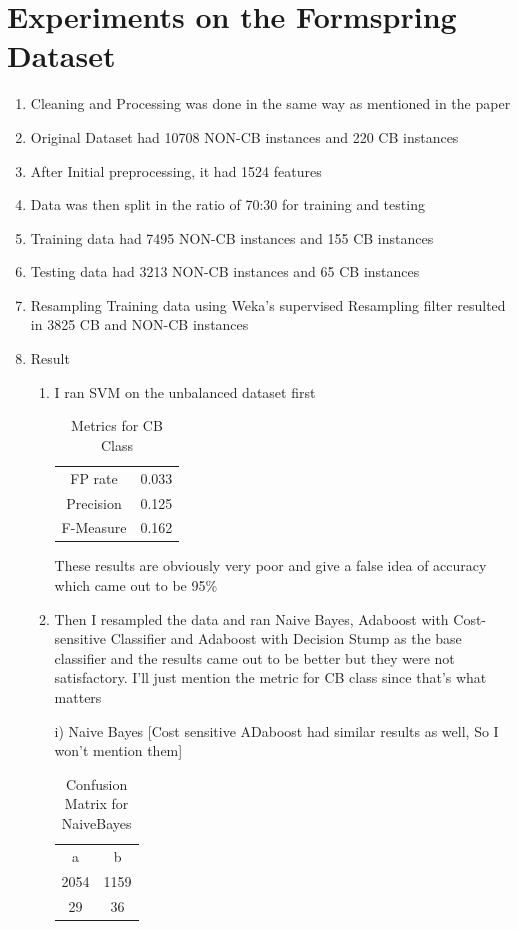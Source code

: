 \documentclass[10pt,conference]{IEEEtran}
\begin{document}
\section{Experiments on the Formspring Dataset}
\label{appendices:Appendix A}
\begin{enumerate}
    \item Cleaning and Processing was done in the same way as mentioned in the paper
    \item Original Dataset had 10708 NON-CB instances and 220 CB instances
    \item After Initial preprocessing, it had 1524 features
    \item Data was then split in the ratio of 70:30 for training and testing
    \item Training data had 7495 NON-CB instances and 155 CB instances
    \item Testing data had 3213 NON-CB instances and 65 CB instances
    \item Resampling Training data using Weka’s supervised Resampling filter resulted in 3825 CB and NON-CB instances
    \item Result
    \begin{enumerate}
        \item I ran SVM on the unbalanced dataset first

\begin{table}[htbp]
    \caption{Metrics for CB Class}
    \centering
    \begin{tabular}{c|c}
        FP rate & 0.033 \\
        Precision & 0.125 \\
        F-Measure & 0.162 \\
    \end{tabular}
\end{table}

These results are obviously very poor and give a false idea of accuracy which came out to be 95\%

        \item Then I resampled the data and ran Naive Bayes, Adaboost with Cost-sensitive Classifier and Adaboost with Decision Stump as the base classifier and the results came out to be better but they were not satisfactory. I’ll just mention the metric for CB class since that’s what matters
        
         i) Naive Bayes [Cost sensitive ADaboost had similar results as well, So I won’t mention them]
        \begin{table}[htbp]
        \caption{Confusion Matrix for NaiveBayes}
        \centering
        \begin{tabular}{c|c}
             a & b \\
            2054 & 1159 \\
            29 & 36 \\
        \end{tabular}
        \end{table}




\end{enumerate}
\end{enumerate}
\end{document}
